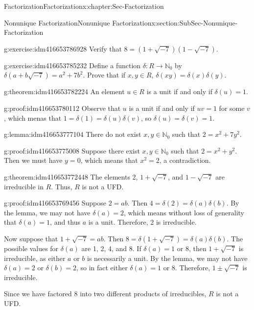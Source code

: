 \documentclass[oneside,10pt,]{book}
\numberwithin{equation}{section}
\def\N{{\mathbb N}}
\begin{document}
\begin{chapterptx}{Factorization}{}{Factorization}{}{}{x:chapter:Sec-Factorization}
\begin{sectionptx}{Nonunique Factorization}{}{Nonunique Factorization}{}{}{x:section:SubSec-Nonunique-Factorization}
\begin{inlineexercise}{}{g:exercise:idm416653786928}
Verify that \(8 = (1+\sqrt{-7})(1-\sqrt{-7})\).%
\end{inlineexercise}
\begin{inlineexercise}{}{g:exercise:idm416653785232}%
Define a function \(\delta : R \to \N_0\) by \(\delta(a+b\sqrt{-7}) = a^2 + 7 b^2\). Prove that if \(x,y\in R\), \(\delta(xy) = \delta(x)\delta(y)\).%
\end{inlineexercise}
\begin{theorem}{}{}{g:theorem:idm416653782224}%
An element \(u\in R\) is a unit if and only if \(\delta(u) = 1\).%
\end{theorem}
\begin{proofptx}{}{g:proof:idm416653780112}
Observe that \(u\) is a unit if and only if \(uv = 1\) for some \(v\), which menas that \(1 = \delta(1) = \delta(u) \delta(v)\), so \(\delta(u) = \delta(v) = 1\).%
\end{proofptx}
\begin{lemma}{}{}{g:lemma:idm416653777104}%
There do not exist \(x,y\in \N_0\) such that \(2 = x^2 + 7y^2\).%
\end{lemma}
\begin{proofptx}{}{g:proof:idm416653775008}
Suppose there exist \(x,y\in \N_0\) such that \(2 = x^2 + y^2\). Then we must have \(y = 0\), which means that \(x^2 = 2\), a contradiction.%
\end{proofptx}
\begin{theorem}{}{}{g:theorem:idm416653772448}%
The elements 2, \(1+ \sqrt{-7}\), and \(1-\sqrt{-7}\) are irreducible in \(R\). Thus, \(R\) is not a UFD.%
\end{theorem}
\begin{proofptx}{}{g:proof:idm416653769456}
Suppose \(2 = ab\). Then \(4 = \delta(2) = \delta(a)\delta(b)\). By the lemma, we may not have \(\delta(a) = 2\), which means without loss of generality that \(\delta(a) = 1\), and thus \(a\) is a unit. Therefore, 2 is irreducible.%
\par
Now suppose that \(1 + \sqrt{-7} = ab\). Then \(8 = \delta(1+\sqrt{-7}) = \delta(a) \delta(b)\). The possible values for \(\delta(a)\) are 1, 2, 4, and 8. If \(\delta(a) = 1\) or 8, then \(1+\sqrt{-7}\) is irreducible, as either \(a\) or \(b\) is necessarily a unit. By the lemma, we may not have \(\delta(a) = 2\) or \(\delta(b) = 2\), so in fact either \(\delta(a) = 1\) or 8. Therefore, \(1\pm \sqrt{-7}\) is irreducible.%
\par
Since we have factored 8 into two different products of irreducibles, \(R\) is not a UFD.%
\end{proofptx}
\end{sectionptx}
\end{chapterptx}
\end{document}
